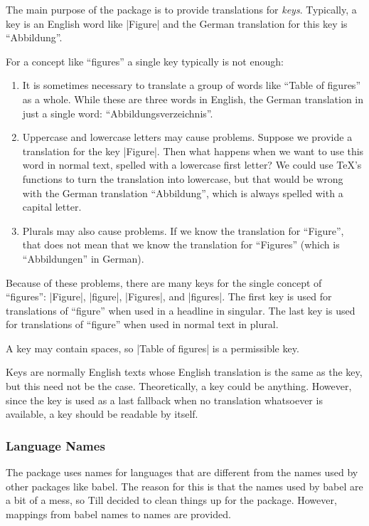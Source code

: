 \documentclass{ltxdoc}
\begin{document}
The main purpose of the  package is to provide translations for
\emph{keys}. Typically, a key is an English word like |Figure| and the German
translation for this key is ``Abbildung''.

For a concept like ``figures'' a single key typically is not enough:
\begin{enumerate} \item It is sometimes necessary to translate a group of words
like ``Table of figures'' as a whole. While these are three words in English,
the German translation in just a single word: ``Abbildungsverzeichnis''. \item
Uppercase and lowercase letters may cause problems. Suppose we provide a
translation for the key |Figure|. Then what happens when we want to use this
word in normal text, spelled with a lowercase first letter? We could use \TeX's
functions to turn the translation into lowercase, but that would be wrong with
the German translation ``Abbildung'', which is always spelled with a capital
letter. \item Plurals may also cause problems. If we know the translation for
``Figure'', that does not mean that we know the translation for ``Figures''
(which is ``Abbildungen'' in German). \end{enumerate}

Because of these problems, there are many keys for the single concept of
``figures'': |Figure|, |figure|, |Figures|, and |figures|. The first key is
used for translations of ``figure'' when used in a headline in singular. The
last key is used for translations of ``figure'' when used in normal text in
plural.

A key may contain spaces, so |Table of figures| is a permissible key.

Keys are normally English texts whose English translation is the same as the
key, but this need not be the case. Theoretically, a key could be anything.
However, since the key is used as a last fallback when no translation
whatsoever is available, a key should be readable by itself.

\subsubsection{Language Names}

The  package uses names for languages that are different from
the names used by other packages like babel. The reason for this is that the
names used by babel are a bit of a mess, so Till decided to clean things up for
the  package. However, mappings from babel names to
 names are provided.
\end{document}
